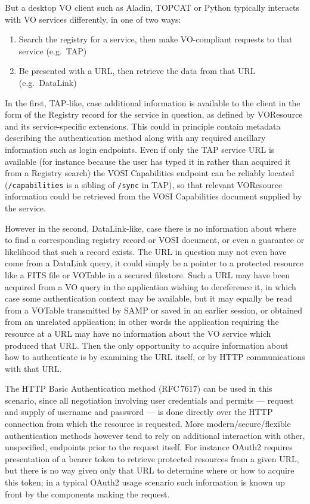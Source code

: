 \documentclass[11pt,a4paper]{ivoa}
\newcommand{\rfc}[1]{RFC\,#1}
\begin{document}
But a desktop VO client such as Aladin, TOPCAT or Python
typically interacts with VO services differently, in one of two
ways:
\begin{enumerate}
\item Search the registry for a service, then make VO-compliant
      requests to that service (e.g.\ TAP)
\item Be presented with a URL, then retrieve the data from that URL
      (e.g.\ DataLink)
\end{enumerate}
In the first, TAP-like, case additional information is available to the
client in the form of the Registry record for the service in question,
as defined by VOResource \citep{2008ivoa.spec.0222P}
and its service-specific extensions.
This could in principle contain metadata describing the authentication
method along with any required ancillary information such as
login endpoints.
Even if only the TAP service URL is available
(for instance because the user has typed it in rather than acquired it
from a Registry search) the VOSI Capabilities endpoint can be reliably
located ({\tt /capabilities} is a sibling of {\tt /sync} in TAP),
so that relevant VOResource information could be retrieved from the VOSI
Capabilities document supplied by the service.

However in the second, DataLink-like, case
there is no information about where to find a corresponding
registry record or VOSI document,
or even a guarantee or likelihood that such a record exists.
The URL in question may not even have come from a DataLink query,
it could simply be a pointer to a protected resource like a
FITS file or VOTable in a secured filestore.
Such a URL may have been acquired from a VO query in the application
wishing to dereference it, in which case some authentication context
may be available,
but it may equally be read from a VOTable transmitted by SAMP
or saved in an earlier session, or obtained from an unrelated application;
in other words the application requiring the resource at a URL may
have no information about the VO service which produced that URL.
Then the only opportunity to acquire information about how to authenticate
is by examining the URL itself, or by HTTP communications with that URL.

The HTTP Basic Authentication method (\rfc{7617})
can be used in this scenario,
since all negotiation involving user credentials and permits ---
request and supply of username and password ---
is done directly
over the HTTP connection from which the resource is requested.
More modern/secure/flexible authentication methods however tend to
rely on additional interaction with other, unspecified, endpoints
prior to the request itself.  For instance OAuth2 requires presentation
of a bearer token to retrieve protected resources from a given URL,
but there is no way given only that URL to determine where or how
to acquire this token;
in a typical OAuth2 usage scenario such information is known up front
by the components making the request.
\end{document}
